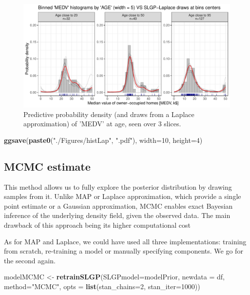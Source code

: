 \documentclass[
]{article}
\newenvironment{Shaded}{\begin{snugshade}}{\end{snugshade}}
\newcommand{\AttributeTok}[1]{\textcolor[rgb]{0.13,0.29,0.53}{#1}}
\newcommand{\DecValTok}[1]{\textcolor[rgb]{0.00,0.00,0.81}{#1}}
\newcommand{\FunctionTok}[1]{\textcolor[rgb]{0.13,0.29,0.53}{\textbf{#1}}}
\newcommand{\NormalTok}[1]{#1}
\newcommand{\OtherTok}[1]{\textcolor[rgb]{0.56,0.35,0.01}{#1}}
\newcommand{\StringTok}[1]{\textcolor[rgb]{0.31,0.60,0.02}{#1}}
\begin{document}
\begin{figure}[H]

{\centering \includegraphics{IntroductionSLGP_files/figure-latex/SLGPLaplaceplot-1} 

}

\caption{Predictive probability density (and draws from a Laplace approximation) of 'MEDV' at age, seen over 3 slices.}\label{fig:SLGPLaplaceplot}
\end{figure}

\begin{Shaded}
\begin{Highlighting}[]
\FunctionTok{ggsave}\NormalTok{(}\FunctionTok{paste0}\NormalTok{(}\StringTok{"./Figures/histLap"}\NormalTok{,  }\StringTok{".pdf"}\NormalTok{), }\AttributeTok{width=}\DecValTok{10}\NormalTok{, }\AttributeTok{height=}\DecValTok{4}\NormalTok{)}
\end{Highlighting}
\end{Shaded}

\subsection{MCMC estimate}\label{mcmc-estimate}

This method allows us to fully explore the posterior distribution by drawing samples from it. Unlike MAP or Laplace approximation, which provide a single point estimate or a Gaussian approximation, MCMC enables exact Bayesian inference of the underlying density field, given the observed data. The main drawback of this approach being its higher computational cost

As for MAP and Laplace, we could have used all three implementations: training from scratch, re-training a model or manually specifying components. We go for the second again.

\begin{Shaded}
\begin{Highlighting}[]
\NormalTok{modelMCMC  }\OtherTok{\textless{}{-}} \FunctionTok{retrainSLGP}\NormalTok{(}\AttributeTok{SLGPmodel=}\NormalTok{modelPrior, }
                          \AttributeTok{newdata =}\NormalTok{ df, }
                          \AttributeTok{method=}\StringTok{"MCMC"}\NormalTok{,}
                          \AttributeTok{opts =} \FunctionTok{list}\NormalTok{(}\AttributeTok{stan\_chains=}\DecValTok{2}\NormalTok{, }\AttributeTok{stan\_iter=}\DecValTok{1000}\NormalTok{))}
\end{Highlighting}
\end{Shaded}
\end{document}
